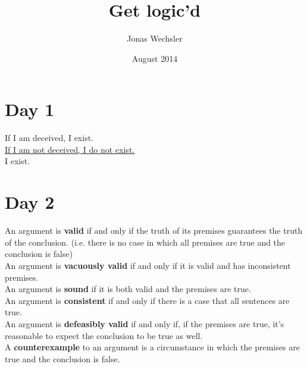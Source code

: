 \documentclass{article}
\title{Get logic'd}
\author{Jonas Wechsler}
\date{August 2014}
\begin{document}
\maketitle

\section{Day 1}
If I am deceived, I exist.
\\ \underline{If I am not deceived, I do not exist.}
\\ I exist.
\section{Day 2}
An argument is \textbf{valid} if and only if the truth of its premises guarantees the truth of the conclusion. (i.e. there is no case in which all premises are true and the conclusion is false)
\\An argument is \textbf{vacuously valid} if and only if it is valid and has inconsistent premises.
\\An argument is \textbf{sound} if it is both valid and the premises are true.
\\An argument is \textbf{consistent} if and only if there is a case that all sentences are true.
\\An argument is \textbf{defeasibly valid} if and only if, if the premises are true, it's reasonable to expect the conclusion to be true as well.
\\A \textbf{counterexample} to an argument is a circumstance in which the premises are true and the conclusion is false.
\end{document}
